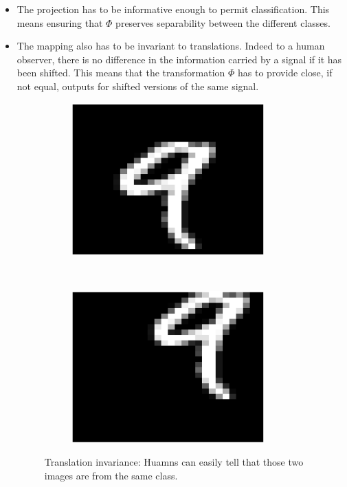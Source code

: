 \documentclass[a4paper,11pt]{report}
\begin{document}
			\begin{itemize}
				\item The projection has to be informative enough to permit classification. This means ensuring that $\Phi$ preserves separability between the different classes.\\

				\item The mapping also has to be invariant to translations. Indeed to a human observer, there is no difference in the information carried by a signal if it has been shifted. This means that the transformation $\Phi$ has to provide close, if not equal, outputs for shifted versions of the same signal.\\
		
				\begin{figure}[h]
					\centering
					\begin{subfigure}[t]{0.48\textwidth}
						\centering
						\includegraphics[height=2.3in]{im_nine_ori.eps}
					\end{subfigure}%
					~ 
					\begin{subfigure}[t]{0.48\textwidth}
						\centering
						\includegraphics[height=2.3in]{im_nine_trl.eps}
					\end{subfigure}
					\caption[Translation invariance.]{\centering Translation invariance: Huamns can easily tell that those two images are from the same class.}
					\label{fig:Illustration translation invariance}
				\end{figure}
	

\end{itemize}
\end{document}
